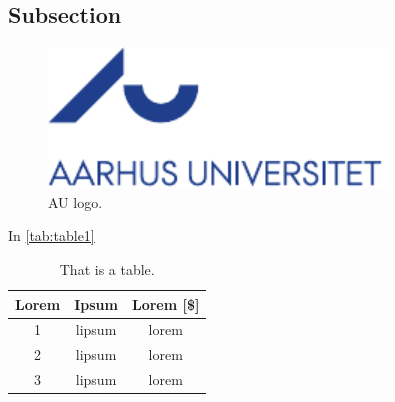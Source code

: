 

\subsection{Subsection}
\lipsum[5]

\begin{figure}[H]
    \centering
    \includegraphics[width = 0.8\textwidth ]{root/aulogo_dk_var1_blaa.pdf}
    \caption{AU logo. \citep{Williams2006}}
    \label{fig:batteryIncreas}
\end{figure}

\lipsum[6-7]

In \autoref{tab:table1}

\begin{table}[H]
    \centering
    \caption{That is a table.}
    \begin{tabular}{|c|c|c|}
    \centering
    \textbf{Lorem} & \textbf{Ipsum} & \textbf{Lorem [\$]} \\ \hline \hline
1   & lipsum    & lorem     \\ \hline   
2   & lipsum    & lorem   \\ \hline
3   & lipsum    & lorem  
    \end{tabular}
    \label{tab:table1}
\end{table}

\lipsum[8]